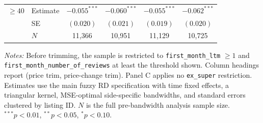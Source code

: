 \begin{table}[!htbp]
\begin{tabular}{llcccc}
\addlinespace
$\geq 40$ & Estimate & $-0.055^{***}$ & $-0.060^{***}$ & $-0.055^{***}$ & $-0.062^{***}$ \\
 & SE & $(0.020)$ & $(0.021)$ & $(0.019)$ & $(0.020)$ \\
 & $N$ & 11,366 & 10,951 & 11,129 & 10,725 \\
\bottomrule
\end{tabular}
\begin{minipage}{0.96\textwidth}
\footnotesize
\textit{Notes:} Before trimming, the sample is restricted to \texttt{first\_month\_ltm} $\geq 1$ and \texttt{first\_month\_number\_of\_reviews} at least the threshold shown. Column headings report (price trim, price-change trim). Panel C applies no \texttt{ex\_super} restriction. Estimates use the main fuzzy RD specification with time fixed effects, a triangular kernel, MSE-optimal side-specific bandwidths, and standard errors clustered by listing ID. $N$ is the full pre-bandwidth analysis sample size. $^{***}p<0.01$, $^{**}p<0.05$, $^{*}p<0.10$.
\end{minipage}
\end{table}
